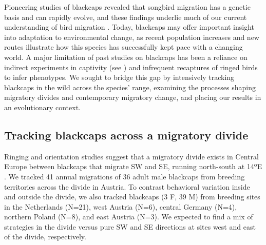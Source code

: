 \documentclass[a4paper, twoside]{templates/ociamthesis}
\begin{document}
Pioneering studies of blackcaps revealed that songbird migration has a genetic basis and can rapidly evolve, and these findings underlie much of our current understanding of bird migration \autocite{bearhopAssortativeMatingMechanism2005,bertholdEvolutionaryAspectsMigratory1988,bertholdHeritabilityMigratoryActivity1994,bertholdRapidMicroevolutionMigratory1992,helbigGeneticBasisMode1996,helbigInheritanceMigratoryDirection1991,muellerIdentificationGeneAssociated2011,pulidoCurrentSelectionLower2010,pulidoFrequencyMigrantsMigratory1996,pulidoGeneticsEvolutionAvian2007,pulidoHeritabilityTimingAutumn2001,rolshausenContemporaryEvolutionReproductive2009}.
Today, blackcaps may offer important insight into adaptation to environmental change, as recent population increases \autocite{ebcc/birdlife/rspb/csoTrendsCommonBirds2018} and new routes \autocite{bertholdRapidMicroevolutionMigratory1992} illustrate how this species has successfully kept pace with a changing world.
A major limitation of past studies on blackcaps has been a reliance on indirect experiments in captivity (see \autocite{vandorenProgrammedFlexibleLongterm2017,zunigaAbruptSwitchMigratory2016}) and infrequent recaptures of ringed birds to infer phenotypes.
We sought to bridge this gap by intensively tracking blackcaps in the wild across the species' range, examining the processes shaping migratory divides and contemporary migratory change, and placing our results in an evolutionary context.

\hypertarget{tracking-blackcaps-across-a-migratory-divide}{%
\subsection{Tracking blackcaps across a migratory divide}\label{tracking-blackcaps-across-a-migratory-divide}}

Ringing and orientation studies suggest that a migratory divide exists in Central Europe between blackcaps that migrate SW and SE, running north-south at 14ºE \autocite{helbigPopulationDifferentiationMigratory1992,helbigSESWmigratingBlackcap1991}. We tracked 41 annual migrations of 36 adult male blackcaps from breeding territories across the divide in Austria. To contrast behavioral variation inside and outside the divide, we also tracked blackcaps (3 F, 39 M) from breeding sites in the Netherlands (N=21), west Austria (N=6), central Germany (N=4), northern Poland (N=8), and east Austria (N=3). We expected to find a mix of strategies in the divide versus pure SW and SE directions at sites west and east of the divide, respectively.
\end{document}
